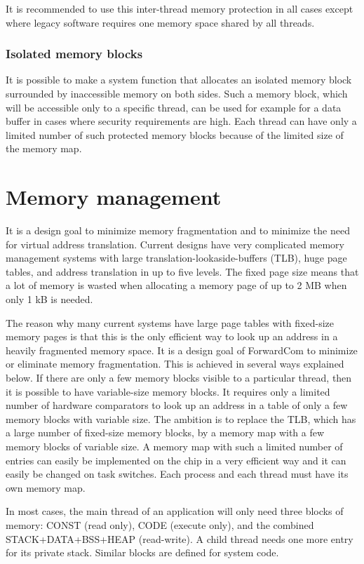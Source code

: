 \documentclass[forwardcom.tex]{subfiles}
\begin{document}
It is recommended to use this inter-thread memory protection in all cases except where legacy software requires one memory space shared by all threads. 
\vv

\subsubsection{Isolated memory blocks} \label{isolatedMemoryBlocks}
It is possible to make a system function that allocates an isolated memory block surrounded by inaccessible memory on both sides. Such a memory block, which will be accessible only to a specific thread, can be used for example for a data buffer in cases where security requirements are high. Each thread can have only a limited number of such protected memory blocks because of the limited size of the memory map.

\section{Memory management} \label{memoryManagement}
It is a design goal to minimize memory fragmentation and to minimize the need for virtual address translation. Current designs have very complicated memory management systems with large translation-lookaside-buffers (TLB), huge page tables,  and address translation in up to five levels. The fixed page size means that a lot of memory is wasted when allocating a memory page of up to 2 MB when only 1 kB is needed.
\vv

The reason why many current systems have large page tables with fixed-size memory pages is that this is the only efficient way to look up an address in a heavily fragmented memory space. It is a design goal of ForwardCom to minimize or eliminate memory fragmentation. This is achieved in several ways explained below. If there are only a few memory blocks visible to a particular thread, then it is possible to have variable-size memory blocks. It requires only a limited number of hardware comparators to look up an address in a table of only a few memory blocks with variable size. The ambition is to replace the TLB, which has a large number of fixed-size memory blocks, by a memory map with a few memory blocks of variable size. 
A memory map with such a limited number of entries can easily be implemented on the chip in a very efficient way and it can easily be changed on task switches. Each process and each thread must have its own memory map.
\vv

In most cases, the main thread of an application will only need three blocks of memory: CONST (read only), CODE (execute only), and the combined STACK+DATA+BSS+HEAP (read-write). A child thread needs one more entry for its private stack. Similar blocks are defined for system code. 
\vv
\end{document}
